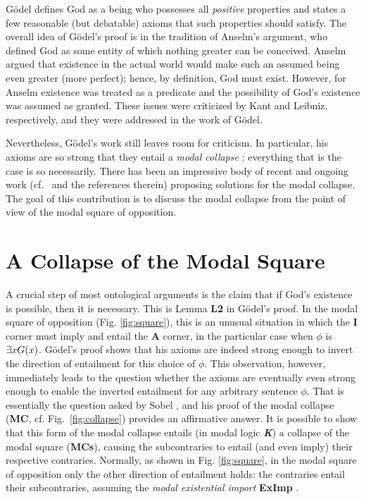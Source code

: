 \documentclass{birkmult}
\theoremstyle{definition}
\theoremstyle{remark}
\numberwithin{equation}{section}
\begin{document}
G\"{o}del defines God as a being who possesses all \emph{positive}
properties and states a few reasonable (but debatable) axioms that
such properties should satisfy.  
The overall idea of G{\"o}del's proof
is in the tradition of Anselm's argument, who defined God as some
entity of which nothing greater can be conceived. 
Anselm argued that
existence in the actual world would make 
such an assumed being even
greater (more perfect); 
hence, by definition, God must exist. However,
for Anselm existence was treated as a predicate and 
the possibility of God's existence was assumed as granted. 
These issues were criticized by Kant and Leibniz, 
respectively, and they were addressed in the work of G\"odel.

Nevertheless, G{\"o}del's work still leaves room for criticism. 
In particular, his axioms are so strong that they entail 
a \emph{modal collapse} 
\cite{Sobel1987,sobel2004logic}: 
everything that is the case is so necessarily.  
There has been an impressive body of recent and ongoing work
(cf.~\cite{sobel2004logic,Fitting,anderson90:_some_emend_of_goedel_ontol_proof,AndersonGettings,bjordal99,fuhrmann05:_exist_notwen,Hajek2002,Hajek2008,ContemporaryBibliography}
and the references therein) proposing solutions for the modal
collapse.  The goal of this contribution is to discuss the modal
collapse from the point of view of the modal square of opposition.


\section{A Collapse of the Modal Square}

A crucial step of most ontological arguments is the claim that if
God's existence is possible, then it is necessary.  This is Lemma
\textbf{L2} in G\"odel's proof.  In the modal square of opposition
(Fig. \ref{fig:square}), this is an unusual situation in which the
\textbf{I} corner must imply and entail the \textbf{A} corner, 
in the particular case when $\phi$ is $\exists x G(x)$.  
G\"odel's proof shows that his axioms are indeed 
strong enough to invert the direction of
entailment for this choice of $\phi$.  
This observation, however, immediately leads 
to the question whether the axioms are eventually 
even strong enough to enable the inverted entailment
for any arbitrary sentence $\phi$.  
That is essentially the question asked by 
Sobel \cite{Sobel1987}, and his proof of the modal collapse
(\textbf{MC}, cf. Fig.~\ref{fig:collapse}) 
provides an affirmative answer. It is possible to show
that this form of the modal collapse entails (in modal logic
\textbf{\emph{K}}) a collapse of the modal square (\textbf{MCs}),
causing the subcontraries to entail 
(and even imply) their respective
contraries. Normally, as shown in Fig. \ref{fig:square}, 
in the modal square of opposition only the 
other direction of entailment holds: the
contraries entail their subcontraries, 
assuming the \emph{modal existential import} \textbf{ExImp}
\cite{ExImport}.
\end{document}
